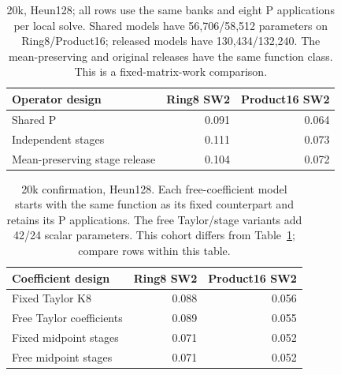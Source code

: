 \begin{table}[H]
\centering\small
\begin{tabular}{@{}lrr@{}}
\toprule
Operator design & Ring8 SW2 & Product16 SW2\\
\midrule
Shared P & 0.091 & 0.064\\
Independent stages & 0.111 & 0.073\\
Mean-preserving stage release & 0.104 & 0.072\\
\bottomrule
\end{tabular}
\caption{20k, Heun128; all rows use the same banks and eight P applications per local solve. Shared models have 56,706/58,512 parameters on Ring8/Product16; released models have 130,434/132,240. The mean-preserving and original releases have the same function class. This is a fixed-matrix-work comparison.}
\label{tab:sharing}
\end{table}
\begin{table}[H]
\centering\small
\begin{tabular}{@{}lrr@{}}
\toprule
Coefficient design & Ring8 SW2 & Product16 SW2\\
\midrule
Fixed Taylor K8 & 0.088 & 0.056\\
Free Taylor coefficients & 0.089 & 0.055\\
Fixed midpoint stages & 0.071 & 0.052\\
Free midpoint stages & 0.071 & 0.052\\
\bottomrule
\end{tabular}
\caption{20k confirmation, Heun128. Each free-coefficient model starts with the same function as its fixed counterpart and retains its P applications. The free Taylor/stage variants add 42/24 scalar parameters. This cohort differs from Table~\ref{tab:sharing}; compare rows within this table.}
\label{tab:coefficients}
\end{table}

